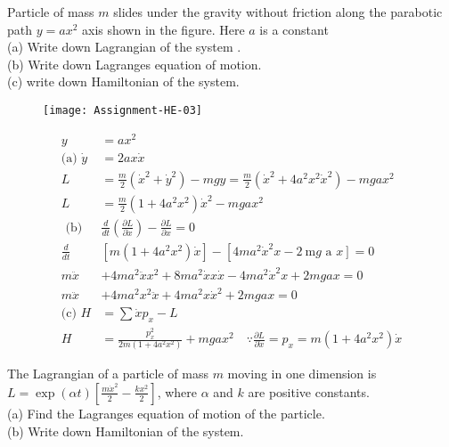 \begin{exercise}
	Particle of mass $m$ slides under the gravity without friction along the parabotic path
	$y=a x^{2}$ axis shown in the figure. Here $a$ is a constant\\
	(a) Write down Lagrangian of the system .\\
	(b) Write down Lagranges equation of motion.\\
	(c) write down Hamiltonian of the system.
	\begin{figure}[H]
		\centering
		\texttt{[image: Assignment-HE-03]}
	\end{figure}
\end{exercise}
	\begin{answer}
	\begin{align*}
	y&=a x^{2}\\
	\text{(a) }\dot{y}&=2 a x \dot{x}\\
	L&=\frac{m}{2}\left(\dot{x}^{2}+\dot{y}^{2}\right)-m g y=\frac{m}{2}\left(\dot{x}^{2}+4 a^{2} x^{2} \dot{x}^{2}\right)-m g a x^{2}\\
	L&=\frac{m}{2}\left(1+4 a^{2} x^{2}\right) \dot{x}^{2}-m g a x^{2}\\
	\text{	(b) }&\frac{d}{d t}\left(\frac{\partial L}{\partial \dot{x}}\right)-\frac{\partial L}{\partial x}=0\\
	\frac{d}{d t}&\left[m\left(1+4 a^{2} x^{2}\right) \dot{x}\right]-\left[4 m a^{2} \dot{x}^{2} x-2 \mathrm{~m} g\right.\text{ a }\left.x\right]=0\\
	m \ddot{x}&+4 m a^{2} \ddot{x} x^{2}+8 m a^{2} \dot{x} x \dot{x}-4 m a^{2} \dot{x}^{2} x+2 m g a x=0\\
	m \ddot{x}&+4 m a^{2} x^{2} \ddot{x}+4 m a^{2} x \dot{x}^{2}+2 m g a x=0\\
	\text{(c) }H&=\sum \dot{x} p_{x}-L\\
	H&=\frac{p_{x}^{2}}{2 m\left(1+4 a^{2} x^{2}\right)}+m g a x^{2} \quad \because \frac{\partial L}{\partial \dot{x}}=p_{x}=m\left(1+4 a^{2} x^{2}\right) \dot{x}
	\end{align*}
\end{answer}
\begin{exercise}
	The Lagrangian of a particle of mass $m$ moving in one dimension is $L=\exp (\alpha t)\left[\frac{m \dot{x}^{2}}{2}-\frac{k x^{2}}{2}\right]$, where $\alpha$ and $k$ are positive constants.\\
	(a) Find the Lagranges equation of motion of the particle.\\
	(b) Write down Hamiltonian of the system.
\end{exercise}
